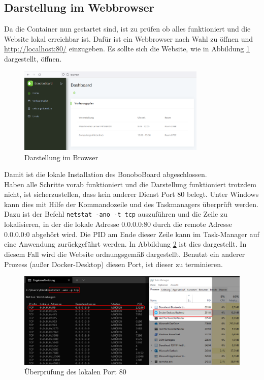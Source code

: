 \documentclass[a4paper,11pt]{scrartcl}
\begin{document}
\subsection{Darstellung im Webbrowser}
Da die Container nun gestartet sind, ist zu prüfen ob alles funktioniert und die Website lokal erreichbar ist. Dafür ist ein Webbrowser nach Wahl zu öffnen und \url{http://localhost:80/} einzugeben. Es sollte sich die Website, wie in Abbildung \ref{img:darstellung} dargestellt, öffnen.
\begin{figure}[H]
\begin{center}
\includegraphics[width=0.8\textwidth]{webbrowser_localhost}
\caption{Darstellung im Browser}
\label{img:darstellung}
\end{center}
\end{figure}
\noindent
Damit ist die lokale Installation des BonoboBoard abgeschlossen.\\

\noindent
Haben alle Schritte vorab funktioniert und die Darstellung funktioniert trotzdem nicht, ist sicherzustellen, dass kein anderer Dienst Port 80 belegt. Unter Windows kann dies mit Hilfe der Kommandozeile und des Taskmanagers überprüft werden. Dazu ist der Befehl \texttt{netstat -ano -t tcp} auszuführen und die Zeile zu lokalisieren, in der die lokale Adresse 0.0.0.0:80 durch die remote Adresse 0.0.0.0:0 abgehört wird. Die PID am Ende dieser Zeile kann im Task-Manager auf eine Anwendung zurückgeführt werden. In Abbildung \ref{img:netstat} ist dies dargestellt. In diesem Fall wird die Website ordnungsgemäß dargestellt. Benutzt ein anderer Prozess (außer Docker-Desktop) diesen Port, ist dieser zu terminieren.
\begin{figure}[H]
\begin{center}
\includegraphics[width=\textwidth]{netstat_port80}
\caption{Überprüfung des lokalen Port 80}
\label{img:netstat}
\end{center}
\end{figure}
\end{document}
